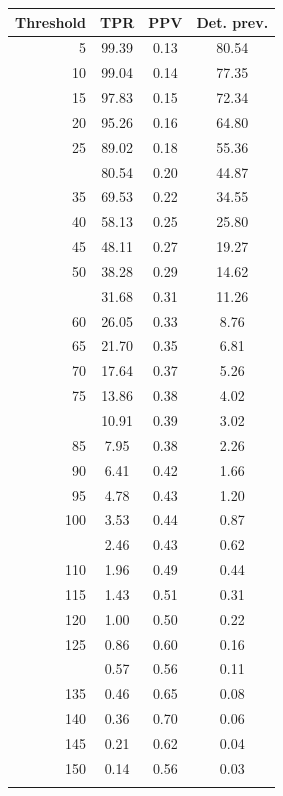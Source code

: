 \documentclass[12pt]{article}
\begin{document}
\begin{minipage}{0.5\textwidth}\small
\begin{tabular}{rccc}
\toprule
\textbf{Threshold} & \textbf{TPR} 
& \textbf{PPV} & \textbf{Det. prev.} \\
\midrule

      5 & 99.39 & 0.13 & 80.54 \\ 
     10 & 99.04 & 0.14 & 77.35 \\ 
     15 & 97.83 & 0.15 & 72.34 \\ 
     20 & 95.26 & 0.16 & 64.80 \\ 
     25 & 89.02 & 0.18 & 55.36 \\  \addlinespace
     30 & 80.54 & 0.20 & 44.87 \\ 
     35 & 69.53 & 0.22 & 34.55 \\ 
     40 & 58.13 & 0.25 & 25.80 \\ 
     45 & 48.11 & 0.27 & 19.27 \\ 
     50 & 38.28 & 0.29 & 14.62 \\  \addlinespace
     55 & 31.68 & 0.31 & 11.26 \\ 
     60 & 26.05 & 0.33 & 8.76 \\ 
     65 & 21.70 & 0.35 & 6.81 \\ 
     70 & 17.64 & 0.37 & 5.26 \\ 
     75 & 13.86 & 0.38 & 4.02 \\  \addlinespace
     80 & 10.91 & 0.39 & 3.02 \\ 
     85 & 7.95 & 0.38 & 2.26 \\ 
     90 & 6.41 & 0.42 & 1.66 \\ 
     95 & 4.78 & 0.43 & 1.20 \\ 
    100 & 3.53 & 0.44 & 0.87 \\  \addlinespace
    105 & 2.46 & 0.43 & 0.62 \\ 
    110 & 1.96 & 0.49 & 0.44 \\ 
    115 & 1.43 & 0.51 & 0.31 \\ 
    120 & 1.00 & 0.50 & 0.22 \\ 
    125 & 0.86 & 0.60 & 0.16 \\  \addlinespace
    130 & 0.57 & 0.56 & 0.11 \\ 
    135 & 0.46 & 0.65 & 0.08 \\ 
    140 & 0.36 & 0.70 & 0.06 \\ 
    145 & 0.21 & 0.62 & 0.04 \\ 
    150 & 0.14 & 0.56 & 0.03 \\  \addlinespace

\end{tabular}
\end{minipage}
\end{document}
